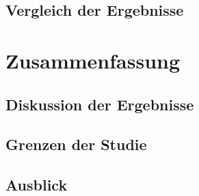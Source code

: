 \section{Vergleich der Ergebnisse}\label{Vergleich der Ergebnisse}

\chapter{Zusammenfassung}

\section{Diskussion der Ergebnisse}\label{Diskussion der Ergebnisse}

\section{Grenzen der Studie}\label{Grenzen der Studie}

\section{Ausblick}\label{Ausblick}
